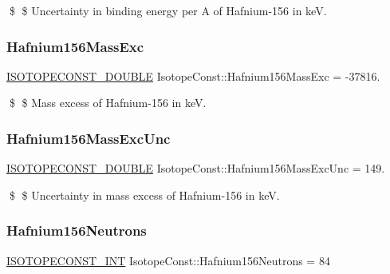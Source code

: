 \$ \$ Uncertainty in binding energy per A of Hafnium-\/156 in keV. \mbox{\label{group___isotope_const-_hafnium-_hf156_ga31fd2c477745d53cbe007ffbcf03faa8}} 
\subsubsection{\texorpdfstring{Hafnium156\+Mass\+Exc}{Hafnium156MassExc}}
{\footnotesize\ttfamily \mbox{\hyperlink{group___isotope_const-_macros_ga8f45a7272ce02c0b4c65c44636ed719a}{I\+S\+O\+T\+O\+P\+E\+C\+O\+N\+S\+T\+\_\+\+D\+O\+U\+B\+LE}} Isotope\+Const\+::\+Hafnium156\+Mass\+Exc = -\/37816.}

\$ \$ Mass excess of Hafnium-\/156 in keV. \mbox{\label{group___isotope_const-_hafnium-_hf156_gac5d9228caf2933958f4c7b875d97c975}} 
\subsubsection{\texorpdfstring{Hafnium156\+Mass\+Exc\+Unc}{Hafnium156MassExcUnc}}
{\footnotesize\ttfamily \mbox{\hyperlink{group___isotope_const-_macros_ga8f45a7272ce02c0b4c65c44636ed719a}{I\+S\+O\+T\+O\+P\+E\+C\+O\+N\+S\+T\+\_\+\+D\+O\+U\+B\+LE}} Isotope\+Const\+::\+Hafnium156\+Mass\+Exc\+Unc = 149.}

\$ \$ Uncertainty in mass excess of Hafnium-\/156 in keV. \mbox{\label{group___isotope_const-_hafnium-_hf156_ga6ff602e2ea59d226436bb1c5804735f0}} 
\subsubsection{\texorpdfstring{Hafnium156\+Neutrons}{Hafnium156Neutrons}}
{\footnotesize\ttfamily \mbox{\hyperlink{group___isotope_const-_macros_ga5f18360b3e99483a35c32d789e62621c}{I\+S\+O\+T\+O\+P\+E\+C\+O\+N\+S\+T\+\_\+\+I\+NT}} Isotope\+Const\+::\+Hafnium156\+Neutrons = 84}

